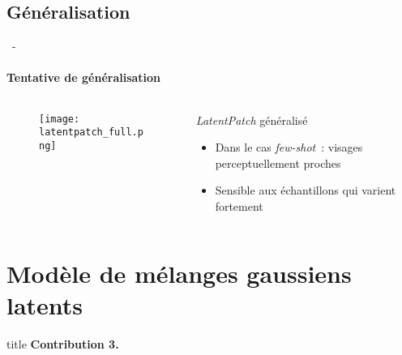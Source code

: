 \documentclass[aspectratio=169, 22pt]{beamer}
\begin{document}
\subsection{Généralisation}
\begin{frame}{\secname~- \subsecname}
  \framesubtitle{Tentative de généralisation}
  \begin{columns}
    \begin{column}{0.6\linewidth}
      \begin{figure}
        \centering
        \texttt{[image: latentpatch\_full.png]}
      \end{figure}
    \end{column}
    \begin{column}{0.4\linewidth}
      \begin{alertblock}{\emph{LatentPatch} généralisé}
        \begin{itemize}
        \item Dans le cas \emph{few-shot} : visages perceptuellement proches
        \item Sensible aux échantillons qui varient fortement
        \end{itemize}
      \end{alertblock}
    \end{column}
  \end{columns}
\end{frame}

\section{Modèle de mélanges gaussiens latents}
\begin{frame}
  \begin{beamercolorbox}[sep=15pt,center,shadow=true,rounded=true]{title}
    \LARGE\bfseries Contribution 3. \\ \secname
  \end{beamercolorbox}
\end{frame}
\end{document}
